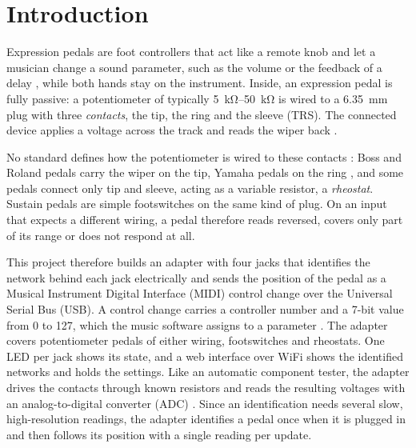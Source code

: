 
\chapter{Introduction}
\label{ch:introduction}

Expression pedals are foot controllers that act like a remote knob and let a musician change a sound parameter, such as the volume or the feedback of a delay \cite{mission2014expression}, while both hands stay on the instrument. Inside, an expression pedal is fully passive: a potentiometer of typically \qtyrange{5}{50}{\kilo\ohm} is wired to a \qty{6.35}{\milli\metre} plug with three \emph{contacts}, the tip, the ring and the sleeve (TRS). The connected device applies a voltage across the track and reads the wiper back \cite{mission2014expression, nonlinearlabs2026pedals}.

No standard defines how the potentiometer is wired to these contacts \cite{mission2014expression}: Boss and Roland pedals carry the wiper on the tip, Yamaha pedals on the ring \cite{nonlinearlabs2026pedals}, and some pedals connect only tip and sleeve, acting as a variable resistor, a \emph{rheostat}. Sustain pedals are simple footswitches on the same kind of plug. On an input that expects a different wiring, a pedal therefore reads reversed, covers only part of its range or does not respond at all.

This project \cite{benson2026proposal} therefore builds an adapter with four jacks that identifies the network behind each jack electrically and sends the position of the pedal as a Musical Instrument Digital Interface (MIDI) control change over the Universal Serial Bus (USB). A control change carries a controller number and a 7-bit value from 0 to 127, which the music software assigns to a parameter \cite{midi2026controlchange}. The adapter covers potentiometer pedals of either wiring, footswitches and rheostats. One LED per jack shows its state, and a web interface over WiFi shows the identified networks and holds the settings. Like an automatic component tester, the adapter drives the contacts through known resistors and reads the resulting voltages with an analog-to-digital converter (ADC) \cite{frejek2011avr}. Since an identification needs several slow, high-resolution readings, the adapter identifies a pedal once when it is plugged in and then follows its position with a single reading per update.
